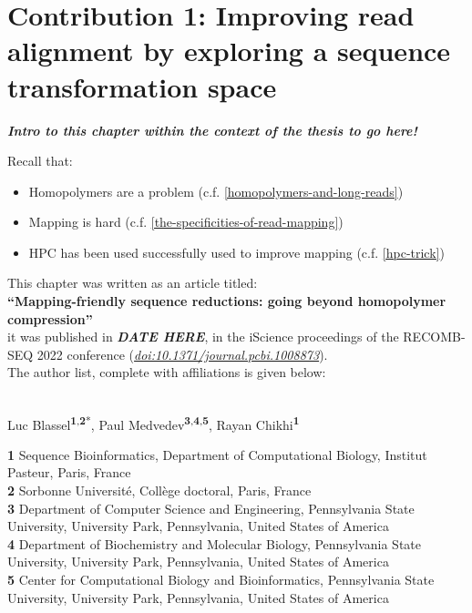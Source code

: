 \documentclass[
  11pt,
  twoside]{scrbook}
\begin{document}
\hypertarget{HPC-paper}{%
\chapter{Contribution 1: Improving read alignment by exploring a sequence transformation space}\label{HPC-paper}}

\textbf{\emph{Intro to this chapter within the context of the thesis to go here!}}

Recall that:

\begin{itemize}
\item
  Homopolymers are a problem (c.f. \ref{homopolymers-and-long-reads})
\item
  Mapping is hard (c.f. \ref{the-specificities-of-read-mapping})
\item
  HPC has been used successfully used to improve mapping (c.f. \ref{hpc-trick})
\end{itemize}

This chapter was written as an article titled:\\
\textbf{``Mapping-friendly sequence reductions: going beyond homopolymer compression''}\\
it was published in \textbf{\emph{DATE HERE}}, in the iScience proceedings of the RECOMB-SEQ 2022 conference (\href{https://doi.org/10.1371/journal.pcbi.1008873}{\emph{doi:10.1371/journal.pcbi.1008873}}).\\
The author list, complete with affiliations is given below:\\
\strut \\

Luc Blassel\textsuperscript{\textbf{1},\textbf{2}*}, Paul Medvedev\textsuperscript{\textbf{3},\textbf{4},\textbf{5}}, Rayan Chikhi\textsuperscript{\textbf{1}}

\textbf{1} Sequence Bioinformatics, Department of Computational Biology, Institut Pasteur, Paris, France\\
\textbf{2} Sorbonne Université, Collège doctoral, Paris, France\\
\textbf{3} Department of Computer Science and Engineering, Pennsylvania State University, University Park, Pennsylvania, United States of America\\
\textbf{4} Department of Biochemistry and Molecular Biology, Pennsylvania State University, University Park, Pennsylvania, United States of America\\
\textbf{5} Center for Computational Biology and Bioinformatics, Pennsylvania State University, University Park, Pennsylvania, United States of America\\
\strut \\
\end{document}
